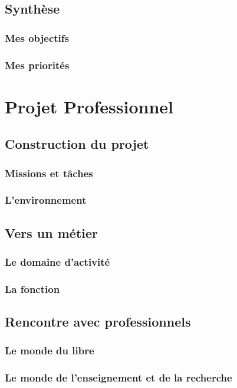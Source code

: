 \documentclass[a4paper]{report}
\begin{document}
\chapter{Synthèse}
\section{Mes objectifs}
\section{Mes priorités}

\part{Projet Professionnel}

\chapter{Construction du projet} 
\section{Missions et tâches}
\section{L'environnement}

\chapter{Vers un métier}
\section{Le domaine d'activité}
\section{La fonction}

\chapter{Rencontre avec professionnels}
\section{Le monde du libre}
\section{Le monde de l'enseignement et de la recherche}
\end{document}
